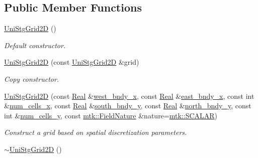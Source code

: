 \subsection*{Public Member Functions}
\begin{DoxyCompactItemize}
\item 
\hyperlink{classmtk_1_1UniStgGrid2D_a40db9a6d21e0f4cf70c478fcc3b94531}{Uni\-Stg\-Grid2\-D} ()
\begin{DoxyCompactList}\small\item\em Default constructor. \end{DoxyCompactList}\item 
\hyperlink{classmtk_1_1UniStgGrid2D_aab6e54b48c3f32de808460ef46f598d4}{Uni\-Stg\-Grid2\-D} (const \hyperlink{classmtk_1_1UniStgGrid2D}{Uni\-Stg\-Grid2\-D} \&grid)
\begin{DoxyCompactList}\small\item\em Copy constructor. \end{DoxyCompactList}\item 
\hyperlink{classmtk_1_1UniStgGrid2D_ad8813b1ffcf23bb759f59f8524702e80}{Uni\-Stg\-Grid2\-D} (const \hyperlink{group__c01-roots_gac080bbbf5cbb5502c9f00405f894857d}{Real} \&\hyperlink{classmtk_1_1UniStgGrid2D_a95b1041558be5bbb087f508d2efbac96}{west\-\_\-bndy\-\_\-x}, const \hyperlink{group__c01-roots_gac080bbbf5cbb5502c9f00405f894857d}{Real} \&\hyperlink{classmtk_1_1UniStgGrid2D_aa626e15a5c494d8de0bf4882bc62a756}{east\-\_\-bndy\-\_\-x}, const int \&\hyperlink{classmtk_1_1UniStgGrid2D_a2d182866a398aba8e4829590e85bf939}{num\-\_\-cells\-\_\-x}, const \hyperlink{group__c01-roots_gac080bbbf5cbb5502c9f00405f894857d}{Real} \&\hyperlink{classmtk_1_1UniStgGrid2D_abf94d51c0dfee07840e1603dfdc49643}{south\-\_\-bndy\-\_\-y}, const \hyperlink{group__c01-roots_gac080bbbf5cbb5502c9f00405f894857d}{Real} \&\hyperlink{classmtk_1_1UniStgGrid2D_aecdc70b590cff2fef54c60f9f7afc0b6}{north\-\_\-bndy\-\_\-y}, const int \&\hyperlink{classmtk_1_1UniStgGrid2D_aed05a801cc9a76dba0ff203cea58a61a}{num\-\_\-cells\-\_\-y}, const \hyperlink{group__c02-enums_ga4c54f2a329cfb4e56213b02a259d19e2}{mtk\-::\-Field\-Nature} \&nature=\hyperlink{namespacemtk_ga4c54f2a329cfb4e56213b02a259d19e2af481d45bd70d41381c7d72e200889205}{mtk\-::\-S\-C\-A\-L\-A\-R})
\begin{DoxyCompactList}\small\item\em Construct a grid based on spatial discretization parameters. \end{DoxyCompactList}\item 
\hyperlink{classmtk_1_1UniStgGrid2D_a55615fed9674be8d8a48a1105e5a1476}{$\sim$\-Uni\-Stg\-Grid2\-D} ()

\end{DoxyCompactItemize}
